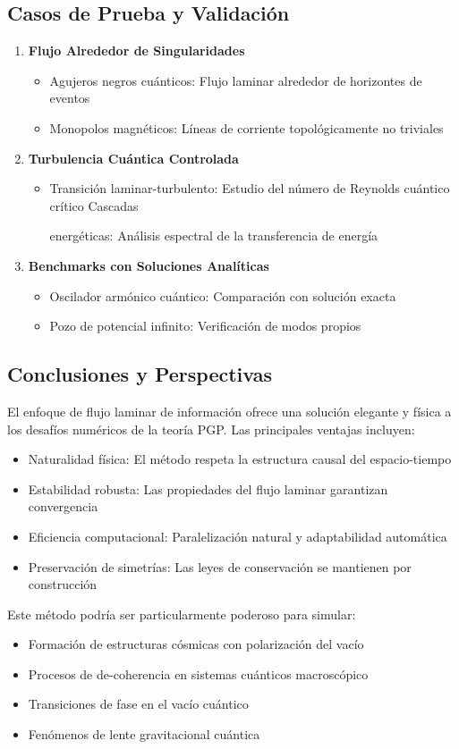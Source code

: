\documentclass{book}
\begin{document}
\subsection*{Casos de Prueba y Validación}
\begin{enumerate}
    \item \textbf{Flujo Alrededor de Singularidades}
    \begin{itemize}
        \item Agujeros negros cuánticos: Flujo laminar alrededor de horizontes de eventos
        \item Monopolos magnéticos: Líneas de corriente topológicamente no triviales
    \end{itemize}
    \item \textbf{Turbulencia Cuántica Controlada}
    \begin{itemize}
    \item Transición laminar-turbulento: Estudio del número de Reynolds cuántico crítico Cascadas 
     
     energéticas: Análisis espectral de la transferencia de energía
  \end{itemize}
    \item \textbf{Benchmarks con Soluciones Analíticas}
    \begin{itemize}
        \item Oscilador armónico cuántico: Comparación con solución exacta
        \item Pozo de potencial infinito: Verificación de modos propios
    \end{itemize}
\end{enumerate}
\subsection*{Conclusiones y Perspectivas}
El enfoque de flujo laminar de información ofrece una solución elegante y física a los desafíos numéricos de la teoría PGP. Las principales ventajas incluyen:
\begin{itemize}
    \item Naturalidad física: El método respeta la estructura causal del espacio-tiempo
    \item Estabilidad robusta: Las propiedades del flujo laminar garantizan convergencia
    \item Eficiencia computacional: Paralelización natural y adaptabilidad automática
    \item Preservación de simetrías: Las leyes de conservación se mantienen por construcción
\end{itemize}
Este método podría ser particularmente poderoso para simular:
\begin{itemize}
    \item Formación de estructuras cósmicas con polarización del vacío
    \item Procesos de de-coherencia en sistemas cuánticos macroscópico
    \item Transiciones de fase en el vacío cuántico
    \item Fenómenos de lente gravitacional cuántica
\end{itemize}
\end{document}
